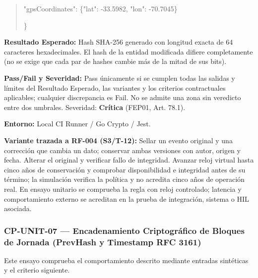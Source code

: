 \begin{quote}
    "\allowbreak{}g\allowbreak{}p\allowbreak{}s\allowbreak{}C\allowbreak{}o\allowbreak{}o\allowbreak{}r\allowbreak{}d\allowbreak{}i\allowbreak{}n\allowbreak{}a\allowbreak{}t\allowbreak{}e\allowbreak{}s\allowbreak{}"\allowbreak{}:\allowbreak{} \{\allowbreak{}"\allowbreak{}l\allowbreak{}a\allowbreak{}t\allowbreak{}"\allowbreak{}:\allowbreak{} -\allowbreak{}3\allowbreak{}3\allowbreak{}.\allowbreak{}5\allowbreak{}9\allowbreak{}8\allowbreak{}2\allowbreak{},\allowbreak{} "\allowbreak{}l\allowbreak{}o\allowbreak{}n\allowbreak{}"\allowbreak{}:\allowbreak{} -\allowbreak{}7\allowbreak{}0\allowbreak{}.\allowbreak{}7\allowbreak{}0\allowbreak{}4\allowbreak{}5\allowbreak{}\}\allowbreak{}\par
  \}\allowbreak{}\par
\end{quote}
\par\noindent\textbf{Resultado Esperado:} Hash SHA-256 generado con longitud exacta de 64 caracteres hexadecimales. El hash de la entidad modificada difiere completamente (no se exige que cada par de hashes cambie más de la mitad de sus bits).\par
\par\noindent\textbf{Pass/Fail y Severidad:} Pass únicamente si se cumplen todas las salidas y límites del Resultado Esperado, las variantes y los criterios contractuales aplicables; cualquier discrepancia es Fail. No se admite una zona sin veredicto entre dos umbrales. Severidad: \textbf{Crítica} (FEP01, Art. 78.1).\par
\par\noindent\textbf{Entorno:} Local CI Runner / Go Crypto / Jest.\par







\par\noindent\textbf{Variante trazada a RF-004 (S3/T-12):} Sellar un evento original y una corrección que cambia un dato; conservar ambas versiones con autor, origen y fecha. Alterar el original y verificar fallo de integridad. Avanzar reloj virtual hasta cinco años de conservación y comprobar disponibilidad e integridad antes de su término; la simulación verifica la política y no acredita cinco años de operación real. En ensayo unitario se comprueba la regla con reloj controlado; latencia y comportamiento externo se acreditan en la prueba de integración, sistema o HIL asociada.\par
\subsubsection*{CP-UNIT-07 — Encadenamiento Criptográfico de Bloques de Jornada (PrevHash y Timestamp RFC 3161)}\label{sec:9-cp-unit-07}
Este ensayo comprueba el comportamiento descrito mediante entradas sintéticas y el criterio siguiente.

